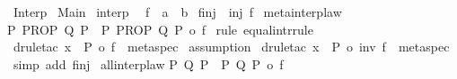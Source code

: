%
\begin{isabellebody}%
%
%
\isamarkuptrue%
%
\isadelimtheory
%
\endisadelimtheory
%
\isatagtheory
{}\isamarkupfalse%
\ Interp\isanewline
{}\ Main\isanewline
{}%
\endisatagtheory
{\isafoldtheory}%
%
\isadelimtheory
%
\endisadelimtheory
%
\isamarkuptrue%
\isamarkupfalse%
\ interp\ {\isacharequal}\isanewline
{}\ f\ {\isacharcolon}{\isacharcolon}\ {\isachardoublequoteopen}{\isacharprime}a\ {\isasymRightarrow}\ {\isacharprime}b{\isachardoublequoteclose}\isanewline
{}\ f{\isacharunderscore}inj\ {\isacharcolon}\ {\isachardoublequoteopen}inj\ f{\isachardoublequoteclose}\isanewline
{}\isanewline
{}\isamarkupfalse%
\ meta{\isacharunderscore}interp{\isacharunderscore}law{\isacharcolon}\isanewline
{\isachardoublequoteopen}{\isacharparenleft}{\isasymAnd}P{\isachardot}\ PROP\ Q\ P{\isacharparenright}\ {\isasymequiv}\ {\isacharparenleft}{\isasymAnd}P{\isachardot}\ PROP\ Q\ {\isacharparenleft}P\ o\ f{\isacharparenright}{\isacharparenright}{\isachardoublequoteclose}\isanewline
%
\isadelimproof
%
\endisadelimproof
%
\isatagproof
{}\isamarkupfalse%
\ {\isacharparenleft}rule\ equal{\isacharunderscore}intr{\isacharunderscore}rule{\isacharparenright}\isanewline
%
\isanewline
{}\isamarkupfalse%
\ {\isacharparenleft}drule{\isacharunderscore}tac\ x\ {\isacharequal}\ {\isachardoublequoteopen}P\ o\ f{\isachardoublequoteclose}\ \ meta{\isacharunderscore}spec{\isacharparenright}\isanewline
{}\isamarkupfalse%
\ {\isacharparenleft}assumption{\isacharparenright}\isanewline
%
\isanewline
{}\isamarkupfalse%
\ {\isacharparenleft}drule{\isacharunderscore}tac\ x\ {\isacharequal}\ {\isachardoublequoteopen}P\ o\ inv\ f{\isachardoublequoteclose}\ \ meta{\isacharunderscore}spec{\isacharparenright}\isanewline
{}\isamarkupfalse%
\ {\isacharparenleft}simp\ add{\isacharcolon}\ f{\isacharunderscore}inj{\isacharparenright}\isanewline
{}\isamarkupfalse%
%
\endisatagproof
{\isafoldproof}%
%
\isadelimproof
\isanewline
%
\endisadelimproof
\isanewline
{}\isamarkupfalse%
\ all{\isacharunderscore}interp{\isacharunderscore}law{\isacharcolon}\isanewline
{\isachardoublequoteopen}{\isacharparenleft}{\isasymforall}P{\isachardot}\ Q\ P{\isacharparenright}\ {\isacharequal}\ {\isacharparenleft}{\isasymforall}P{\isachardot}\ Q\ {\isacharparenleft}P\ o\ f{\isacharparenright}{\isacharparenright}{\isachardoublequoteclose}\isanewline

\end{isabellebody}

